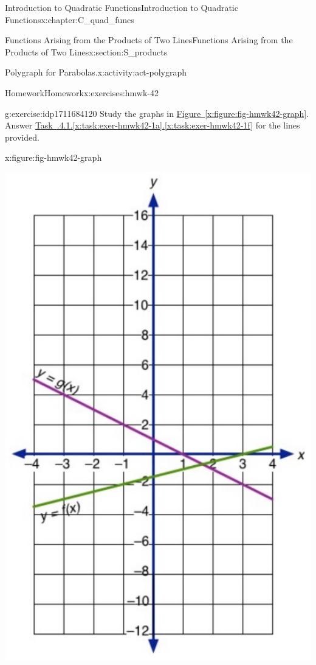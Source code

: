 \documentclass[oneside,10pt,]{book}
\newcommand{\xreffont}{\relax}
\numberwithin{equation}{chapter}
\begin{document}
\begin{chapterptx}{Introduction to Quadratic Functions}{}{Introduction to Quadratic Functions}{}{}{x:chapter:C_quad_funcs}
\begin{sectionptx}{Functions Arising from the Products of Two Lines}{}{Functions Arising from the Products of Two Lines}{}{}{x:section:S_products}
\begin{activity}{Polygraph for Parabolas.}{x:activity:act-polygraph}
\end{activity}%
%
%
\typeout{************************************************}
\typeout{************************************************}
%
\begin{exercises-subsection}{Homework}{}{Homework}{}{}{x:exercises:hmwk-42}
\begin{divisionexercise}{1}{}{}{g:exercise:idp1711684120}%
Study the graphs in \hyperref[x:figure:fig-hmwk42-graph]{Figure~{\xreffont\ref{x:figure:fig-hmwk42-graph}}}. Answer \hyperref[x:task:exer-hmwk42-1a]{Task~{\xreffont 4.2.4.1}.{\xreffont\ref{x:task:exer-hmwk42-1a}}\textendash{}{\xreffont 4.2.4.1}.{\xreffont\ref{x:task:exer-hmwk42-1f}}} for the lines provided.%
\begin{figureptx}{}{x:figure:fig-hmwk42-graph}{}%
\begin{image}{0.25}{0.5}{0.25}%
\includegraphics[width=\linewidth]{external/hmwk42-1.pdf}

\end{image}
\end{figureptx}
\end{divisionexercise}
\end{exercises-subsection}
\end{sectionptx}
\end{chapterptx}
\end{document}
